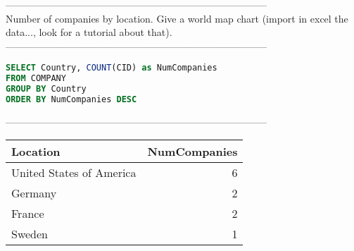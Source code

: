 --------------------------------------------------------------------------------
\\Number of companies by location. Give a world map chart (import in excel the data..., look for a tutorial about that).\\
--------------------------------------------------------------------------------
\begin{lstlisting}[language = SQL]
SELECT Country, COUNT(CID) as NumCompanies 
FROM COMPANY 
GROUP BY Country
ORDER BY NumCompanies DESC
\end{lstlisting}
--------------------------------------------------------------------------------
\\\begin{tabular}{lr}
\toprule
 Location                 &   NumCompanies \\
\midrule
 United States of America &              6 \\
 Germany                  &              2 \\
 France                   &              2 \\
 Sweden                   &              1 \\
\bottomrule
\end{tabular}